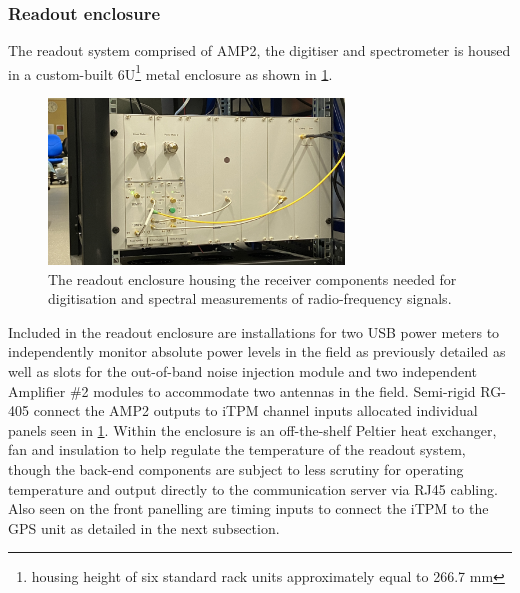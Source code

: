 \subsubsection{Readout enclosure}
The readout system comprised of AMP2, the digitiser and spectrometer is housed in a custom-built 6U\footnote{housing height of six standard rack units approximately equal to 266.7 mm} metal enclosure as shown in \cref{fig:readout_enclosure}.
\begin{figure}
    \centering
    \includegraphics[width=0.7\textwidth]{readout_enclosure.jpeg}
    \caption{The readout enclosure housing the receiver components needed for digitisation and spectral measurements of radio-frequency signals.}
    \label{fig:readout_enclosure}
\end{figure}
Included in the readout enclosure are installations for two USB power meters to independently monitor absolute power levels in the field as previously detailed as well as slots for the out-of-band noise injection module and two independent Amplifier \#2 modules to accommodate two antennas in the field. Semi-rigid RG-405 connect the AMP2 outputs to iTPM channel inputs allocated individual panels seen in \cref{fig:readout_enclosure}. Within the enclosure is an off-the-shelf Peltier heat exchanger, fan and insulation to help regulate the temperature of the readout system, though the back-end components are subject to less scrutiny for operating temperature and output directly to the communication server via RJ45 cabling. Also seen on the front panelling are timing inputs to connect the iTPM to the GPS unit as detailed in the next subsection.


